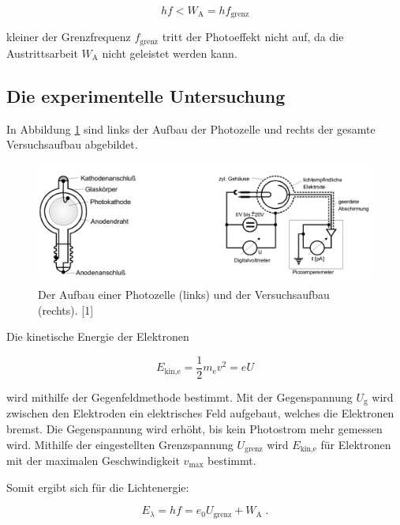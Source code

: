 \begin{equation*}
    h f < W_\text{A} = h f_\text{grenz}
\end{equation*}

kleiner der Grenzfrequenz $f_\text{grenz}$ tritt der Photoeffekt nicht auf, da die Austrittsarbeit $W_\text{A}$
nicht geleistet werden kann.

\subsection{Die experimentelle Untersuchung}

In Abbildung \ref{fig:bild1} sind links der Aufbau der Photozelle und rechts der gesamte Versuchsaufbau abgebildet.

\begin{figure}
    \centering
    \includegraphics[scale=0.37]{content/bild1.png}
    \caption{Der Aufbau einer Photozelle (links) und der Versuchsaufbau (rechts). [1]}
    \label{fig:bild1}
\end{figure}

  Die kinetische Energie der Elektronen

\begin{equation}
    E_\text{kin,e} = \frac{1}{2} m_\text{e} v^2 = e U
    \label{eqn:Ekin}
\end{equation}

  wird mithilfe der Gegenfeldmethode bestimmt. Mit der Gegenspannung $U_\text{g}$ wird zwischen
  den Elektroden ein elektrisches Feld aufgebaut, welches die Elektronen bremst.
  Die Gegenspannung wird erhöht, bis kein Photostrom mehr gemessen wird. Mithilfe der 
  eingestellten Grenzspannung $U_\text{grenz}$ wird $E_\text{kin,e}$ für Elektronen
  mit der maximalen Geschwindigkeit $v_\text{max}$ bestimmt.

  Somit ergibt sich für die Lichtenergie:

\begin{equation}
    E_\lambda = h f = e_0 U_\text{grenz} + W_\text{A} \; .
    \label{eqn:lichtenergie2}
\end{equation}

